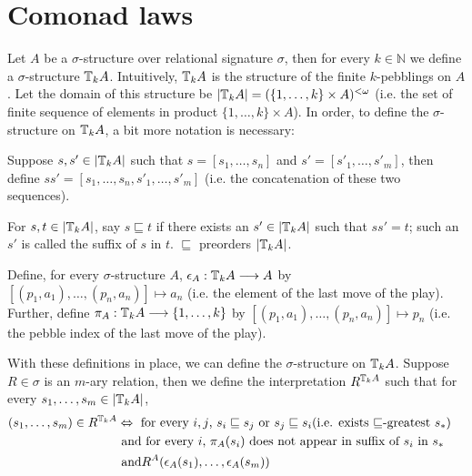 \section{Comonad laws}
Let $A$ be a $\sigma$-structure over relational signature $\sigma$, then for every $k \in \mathbb{N}$ we define a $\sigma$-structure ${\mathbb{T}_{k}A}$. Intuitively, ${\mathbb{T}_{k}A}$ is the structure of the finite $k$-pebblings on $A$. Let the domain of this structure be $|{\mathbb{T}_{k}A}| = (\{1,\dots,k\} \times A)^{<\omega}$ (i.e. the set of finite sequence of elements in product $\{1,\dots,k\} \times A$). In order, to define the $\sigma$-structure on ${\mathbb{T}_{k}A}$, a bit more notation is necessary:\\
\begin{defn}
Suppose $s,s' \in |{\mathbb{T}_{k}A}|$ such that $s = [s_{1},\dots,s_{n}]$ and $s' = [s'_{1},\dots,s'_{m}]$, then define $ss' = [s_{1},
\dots,s_{n},s'_{1},\dots,s'_{m}]$ (i.e. the concatenation of these two sequences).
\end{defn}
\begin{defn}
For $s,t \in |{\mathbb{T}_{k}A}|$, say $s \sqsubseteq t$ if there exists an $s' \in |{\mathbb{T}_{k}A}|$ such that $ss' = t$; such an $s'$ is called the suffix of $s$ in $t$. $\sqsubseteq$ preorders $|{\mathbb{T}_{k}A}|$. 
\end{defn}
\begin{defn}
Define, for every $\sigma$-structure $A$, $\epsilon_{A}:{\mathbb{T}_{k}A} \longrightarrow A$ by $[(p_{1},a_{1}),\dots,(p_{n},a_{n})] \mapsto a_{n}$ (i.e. the element of the last move of the play). Further, define $\pi_{A}:{\mathbb{T}_{k}A} \longrightarrow \{1,\dots,k\}$ by $[(p_{1},a_{1}),\dots,(p_{n},a_{n})] \mapsto p_{n}$ (i.e. the pebble index of the last move of the play).
\label{defn:epsilon}
\end{defn}
With these definitions in place, we can define the $\sigma$-structure on ${\mathbb{T}_{k}A}$. Suppose $R \in \sigma$ is an $m$-ary relation, then we define the interpretation $R^{{\mathbb{T}_{k}A}}$ such that for every $s_{1},\dots,s_{m} \in |{\mathbb{T}_{k}A}|$, 
\begin{align}
(s_{1},\dots,s_{m}) \in R^{{\mathbb{T}_{k}A}}  &\Leftrightarrow    \text{ for every $i,j$, } s_{i} \sqsubseteq s_{j} \text{ or } s_{j} \sqsubseteq s_{i} \text{(i.e. exists $\sqsubseteq$-greatest $s_{*}$)} & \label{eq:R1st}\\
&\text{ and for every $i$, } \pi_{A}(s_{i}) \text{ does not appear in suffix of $s_{i}$ in $s_{*}$ } & \label{eq:R2nd} \\
&\text{ and} R^{A}(\epsilon_{A}(s_{1}),\dots,\epsilon_{A}(s_{m})) & \label{eq:R3rd}
\end{align}
